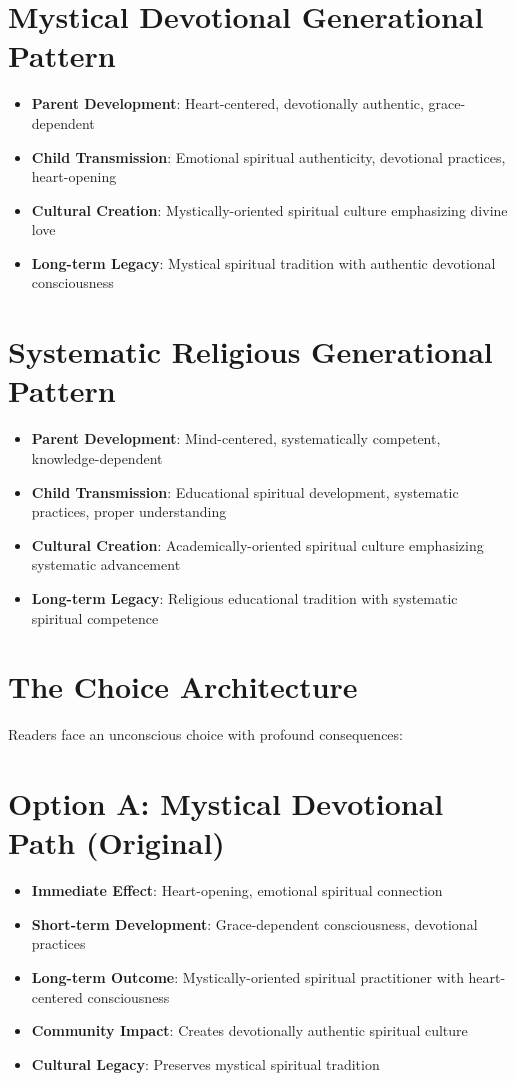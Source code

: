 \documentclass[11pt,twoside]{book}
\begin{document}
\section*{Mystical Devotional Generational Pattern}
\label{sec:orga413573}
\begin{itemize}
\item \textbf{\textbf{Parent Development}}: Heart-centered, devotionally authentic, grace-dependent
\item \textbf{\textbf{Child Transmission}}: Emotional spiritual authenticity, devotional practices, heart-opening
\item \textbf{\textbf{Cultural Creation}}: Mystically-oriented spiritual culture emphasizing divine love
\item \textbf{\textbf{Long-term Legacy}}: Mystical spiritual tradition with authentic devotional consciousness
\end{itemize}
\section*{Systematic Religious Generational Pattern}
\label{sec:org06012c2}
\begin{itemize}
\item \textbf{\textbf{Parent Development}}: Mind-centered, systematically competent, knowledge-dependent
\item \textbf{\textbf{Child Transmission}}: Educational spiritual development, systematic practices, proper understanding
\item \textbf{\textbf{Cultural Creation}}: Academically-oriented spiritual culture emphasizing systematic advancement
\item \textbf{\textbf{Long-term Legacy}}: Religious educational tradition with systematic spiritual competence
\end{itemize}
\section*{The Choice Architecture}
\label{sec:orgf2a9929}

Readers face an unconscious choice with profound consequences:
\section*{Option A: Mystical Devotional Path (Original)}
\label{sec:orgef1f17b}
\begin{itemize}
\item \textbf{\textbf{Immediate Effect}}: Heart-opening, emotional spiritual connection
\item \textbf{\textbf{Short-term Development}}: Grace-dependent consciousness, devotional practices
\item \textbf{\textbf{Long-term Outcome}}: Mystically-oriented spiritual practitioner with heart-centered consciousness
\item \textbf{\textbf{Community Impact}}: Creates devotionally authentic spiritual culture
\item \textbf{\textbf{Cultural Legacy}}: Preserves mystical spiritual tradition
\end{itemize}
\end{document}
